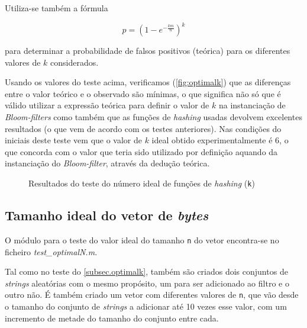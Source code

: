 \documentclass[a4paper,11pt,openright,oneside]{report}
\begin{document}
Utiliza-se também a fórmula

$$ p =  \left(1 - e^{-\frac{km}{n}}\right)^k $$

para determinar a probabilidade de falsos positivos (teórica) para os diferentes valores de $k$ considerados.

Usando os valores do teste acima, verificamos (\autoref{fig:optimalk}) que as diferenças entre o valor teórico e o observado são mínimas, o que significa não só que é válido utilizar a expressão teórica para definir o valor de $k$ na instanciação de \textit{Bloom-filters} como também que as funções de \textit{hashing} usadas devolvem excelentes resultados (o que vem de acordo com os testes anteriores). Nas condições do iniciais deste teste vem que o valor de $k$ ideal obtido experimentalmente é 6, o que concorda com o valor que teria sido utilizado por definição aquando da instanciação do \textit{Bloom-filter}, através da dedução teórica.

\begin{figure}[ht]	
\center
{}
\caption{Resultados do teste do número ideal de funções de \textit{hashing} (\texttt{k})}
\label{fig:optimalk}
\end{figure}

\subsection{Tamanho ideal do vetor de \textit{bytes}}
\label{subsec.optimaln}

O módulo para o teste do valor ideal do tamanho \texttt{n} do vetor encontra-se no ficheiro \textit{test\_optimalN.m}.

Tal como no teste do \autoref{subsec.optimalk}, também são criados dois conjuntos de \textit{strings} aleatórias com o mesmo propósito, um para ser adicionado ao filtro e o outro não. É também criado um vetor com diferentes valores de \texttt{n}, que vão desde o tamanho do conjunto de \textit{strings} a adicionar até 10 vezes esse valor, com um incremento de metade do tamanho do conjunto entre cada.
\end{document}
